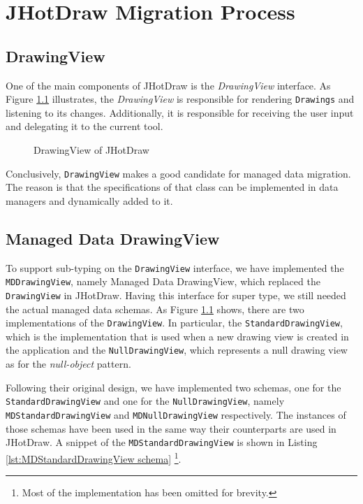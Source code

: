
\chapter{JHotDraw Migration Process}\label{Migration Process}

\section{DrawingView}
One of the main components of JHotDraw is the \textit{DrawingView} interface.
As Figure \ref{fig:JHotDraw_DrawingView} illustrates, the \textit{DrawingView} is responsible for rendering \texttt{Drawings} and listening to its changes.
Additionally, it is responsible for receiving the user input and delegating it to the current tool.

\begin{figure}[H]
	\centering
  	\caption{DrawingView of JHotDraw}
  	\label{fig:JHotDraw_DrawingView}
\end{figure}

Conclusively, \texttt{DrawingView} makes a good candidate for managed data migration.
The reason is that the specifications of that class can be implemented in data managers and dynamically added to it.

\section{Managed Data DrawingView}
To support sub-typing on the \texttt{DrawingView} interface, we have implemented the \texttt{MDDrawingView}, namely Managed Data DrawingView, which replaced the \texttt{DrawingView} in JHotDraw.
Having this interface for super type, we still needed the actual managed data schemas.
As Figure \ref{fig:JHotDraw_DrawingView} shows, there are two implementations of the \texttt{DrawingView}.
In particular, the \texttt{StandardDrawingView}, which is the implementation that is used when a new drawing view is created in the application and the \texttt{NullDrawingView}, which represents a null drawing view as for the \textit{null-object} pattern.

Following their original design, we have implemented two schemas, one for the \texttt{StandardDrawingView} and one for the \texttt{NullDrawingView}, namely \texttt{MDStandardDrawingView} and \texttt{MDNullDrawingView} respectively.
The instances of those schemas have been used in the same way their counterparts are used in JHotDraw.
A snippet of the \texttt{MDStandardDrawingView} is shown in Listing \ref{lst:MDStandardDrawingView schema} \footnote{Most of the implementation has been omitted for brevity.}.

